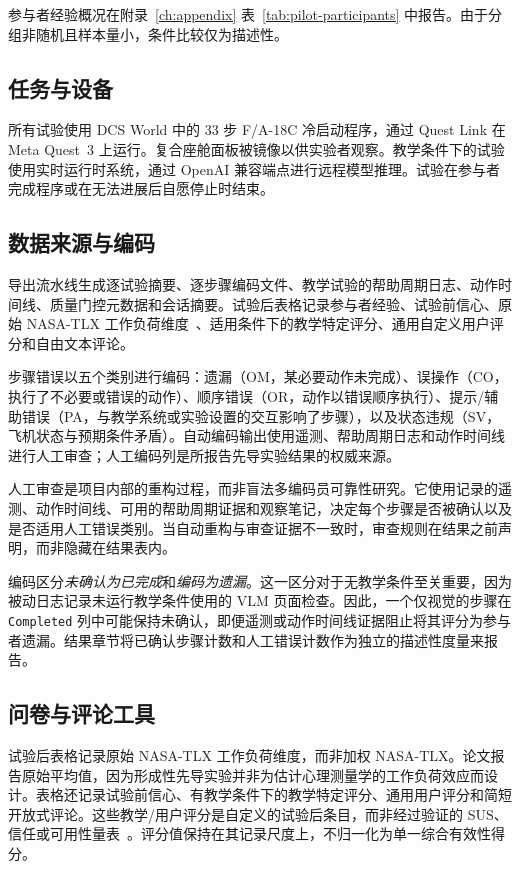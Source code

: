 参与者经验概况在附录~\ref{ch:appendix} 表~\ref{tab:pilot-participants} 中报告。由于分组非随机且样本量小，条件比较仅为描述性。

\subsection{任务与设备}

所有试验使用 DCS World 中的 33 步 F/A-18C 冷启动程序，通过 Quest Link 在 Meta Quest~3 上运行。复合座舱面板被镜像以供实验者观察。教学条件下的试验使用实时运行时系统，通过 OpenAI 兼容端点进行远程模型推理。试验在参与者完成程序或在无法进展后自愿停止时结束。

\subsection{数据来源与编码}

导出流水线生成逐试验摘要、逐步骤编码文件、教学试验的帮助周期日志、动作时间线、质量门控元数据和会话摘要。试验后表格记录参与者经验、试验前信心、原始 NASA-TLX 工作负荷维度~\citep{hart1988nasa}、适用条件下的教学特定评分、通用自定义用户评分和自由文本评论。

步骤错误以五个类别进行编码：遗漏（OM，某必要动作未完成）、误操作（CO，执行了不必要或错误的动作）、顺序错误（OR，动作以错误顺序执行）、提示/辅助错误（PA，与教学系统或实验设置的交互影响了步骤），以及状态违规（SV，飞机状态与预期条件矛盾）。自动编码输出使用遥测、帮助周期日志和动作时间线进行人工审查；人工编码列是所报告先导实验结果的权威来源。

人工审查是项目内部的重构过程，而非盲法多编码员可靠性研究。它使用记录的遥测、动作时间线、可用的帮助周期证据和观察笔记，决定每个步骤是否被确认以及是否适用人工错误类别。当自动重构与审查证据不一致时，审查规则在结果之前声明，而非隐藏在结果表内。

编码区分\emph{未确认为已完成}和\emph{编码为遗漏}。这一区分对于无教学条件至关重要，因为被动日志记录未运行教学条件使用的 VLM 页面检查。因此，一个仅视觉的步骤在 \texttt{Completed} 列中可能保持未确认，即便遥测或动作时间线证据阻止将其评分为参与者遗漏。结果章节将已确认步骤计数和人工错误计数作为独立的描述性度量来报告。

\subsection{问卷与评论工具}

试验后表格记录原始 NASA-TLX 工作负荷维度，而非加权 NASA-TLX。论文报告原始平均值，因为形成性先导实验并非为估计心理测量学的工作负荷效应而设计。表格还记录试验前信心、有教学条件下的教学特定评分、通用用户评分和简短开放式评论。这些教学/用户评分是自定义的试验后条目，而非经过验证的 SUS、信任或可用性量表~\citep{lee2004trust,visser2023trust}。评分值保持在其记录尺度上，不归一化为单一综合有效性得分。

